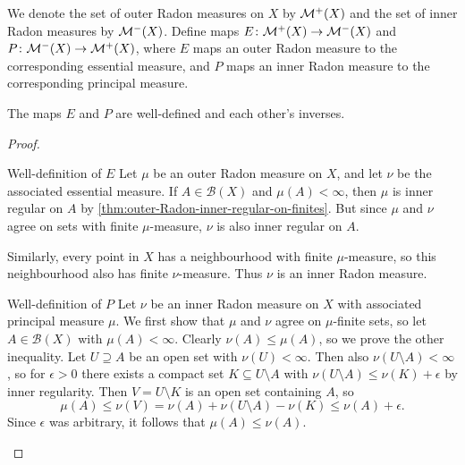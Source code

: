 \documentclass[article, a4paper, 11pt, oneside]{memoir}
\numberwithin{equation}{chapter}
\newcommand{\calB}{\mathcal{B}}
\newcommand{\borel}[1]{\calB(#1)}
\begin{document}
We denote the set of outer Radon measures on $X$ by $\mathcal{M}^{+}(X)$ and the set of inner Radon measures by $\mathcal{M}^{-}(X)$. Define maps $E \colon \mathcal{M}^{+}(X) \to \mathcal{M}^{-}(X)$ and $P \colon \mathcal{M}^{-}(X) \to \mathcal{M}^{+}(X)$, where $E$ maps an outer Radon measure to the corresponding essential measure, and $P$ maps an inner Radon measure to the corresponding principal measure.

\begin{theorem}
    \label{thm:Radon-pair-inverses}
    The maps $E$ and $P$ are well-defined and each other's inverses.
\end{theorem}

\begin{proof}
\begin{proofsec}
    \item[Well-definition of $E$]
    Let $\mu$ be an outer Radon measure on $X$, and let $\nu$ be the associated essential measure. If $A \in \borel{X}$ and $\mu(A) < \infty$, then $\mu$ is inner regular on $A$ by \cref{thm:outer-Radon-inner-regular-on-finites}. But since $\mu$ and $\nu$ agree on sets with finite $\mu$-measure, $\nu$ is also inner regular on $A$.

    Similarly, every point in $X$ has a neighbourhood with finite $\mu$-measure, so this neighbourhood also has finite $\nu$-measure. Thus $\nu$ is an inner Radon measure.

    \item[Well-definition of $P$]
    Let $\nu$ be an inner Radon measure on $X$ with associated principal measure $\mu$. We first show that $\mu$ and $\nu$ agree on $\mu$-finite sets, so let $A \in \borel{X}$ with $\mu(A) < \infty$. Clearly $\nu(A) \leq \mu(A)$, so we prove the other inequality. Let $U \supseteq A$ be an open set with $\nu(U) < \infty$. Then also $\nu(U \setminus A) < \infty$, so for $\epsilon > 0$ there exists a compact set $K \subseteq U \setminus A$ with $\nu(U \setminus A) \leq \nu(K) + \epsilon$ by inner regularity. Then $V = U \setminus K$ is an open set containing $A$, so
    \begin{equation*}
        \mu(A)
            \leq \nu(V)
            = \nu(A) + \nu(U \setminus A) - \nu(K)
            \leq \nu(A) + \epsilon.
    \end{equation*}
    Since $\epsilon$ was arbitrary, it follows that $\mu(A) \leq \nu(A)$.


\end{proofsec}
\end{proof}
\end{document}
